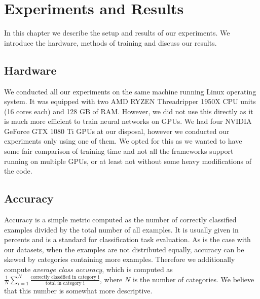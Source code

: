 \chapter{Experiments and Results}
\label{sec:chap5}
In this chapter we describe the setup and results of our experiments. We introduce the hardware, methods of training and discuss our results.

\section{Hardware}
We conducted all our experiments on the same machine running Linux operating system. It was equipped with two AMD RYZEN Threadripper 1950X CPU units (16 cores each) and 128 GB of RAM. However, we did not use this directly as it is much more efficient to train neural networks on GPUs. We had four NVIDIA GeForce GTX 1080 Ti GPUs at our disposal, however we conducted our experiments only using one of them. We opted for this as we wanted to have some fair comparison of training time and not all the frameworks support running on multiple GPUs, or at least not without some heavy modifications of the code. 

\section{Accuracy}
Accuracy is a simple metric computed as the number of correctly classified examples divided by the total number of all examples. It is usually given in percents and is a standard for classification task evaluation. As is the case with our datasets, when the examples are not distributed equally, accuracy can be skewed by categories containing more examples. Therefore we additionally compute \textit{average class accuracy}, which is computed as $\frac{1}{N}\sum_{i=1}^{N} {\frac{\text{correctly classified in category i}}{\text{total in category i}}} $, where $N$ is the number of categories. We believe that this number is somewhat more descriptive. 


